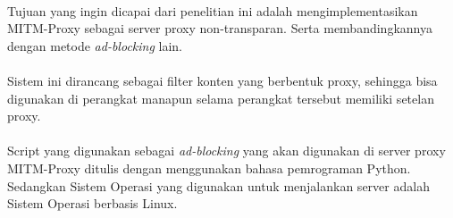 \documentclass[../PROPOSAL_PRA_SKRIPSI_ALDZIKRI_DWIJAYANTO_PRATHAMA.tex]{subfiles}
\begin{document}
  \paragraph*{}Tujuan yang ingin dicapai dari penelitian ini
  adalah mengimplementasikan MITM-Proxy sebagai server proxy
  non-transparan. Serta membandingkannya dengan metode
  \textit{ad-blocking} lain.

  \paragraph*{}Sistem ini dirancang sebagai filter konten
  yang berbentuk proxy, sehingga bisa digunakan di perangkat
  manapun selama perangkat tersebut memiliki setelan proxy.

  \paragraph*{}Script yang digunakan sebagai
  \textit{ad-blocking} yang akan digunakan di server proxy
  MITM-Proxy ditulis dengan menggunakan bahasa pemrograman
  Python. Sedangkan Sistem Operasi yang digunakan untuk
  menjalankan server adalah Sistem Operasi berbasis Linux.
\end{document}

